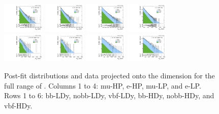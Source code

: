 \begin{figure}[htbp]
  \includegraphics[width=0.18\textwidth]{fig/fitValidation/PostFit_SR_MVV__mu_HP_nobb_HDy_Run2.pdf}
  \includegraphics[width=0.18\textwidth]{fig/fitValidation/PostFit_SR_MVV__e_HP_nobb_HDy_Run2.pdf}
  \includegraphics[width=0.18\textwidth]{fig/fitValidation/PostFit_SR_MVV__mu_LP_nobb_HDy_Run2.pdf}
  \includegraphics[width=0.18\textwidth]{fig/fitValidation/PostFit_SR_MVV__e_LP_nobb_HDy_Run2.pdf}\\
  \includegraphics[width=0.18\textwidth]{fig/fitValidation/PostFit_SR_MVV__mu_HP_vbf_HDy_Run2.pdf}
  \includegraphics[width=0.18\textwidth]{fig/fitValidation/PostFit_SR_MVV__e_HP_vbf_HDy_Run2.pdf}
  \includegraphics[width=0.18\textwidth]{fig/fitValidation/PostFit_SR_MVV__mu_LP_vbf_HDy_Run2.pdf}
  \includegraphics[width=0.18\textwidth]{fig/fitValidation/PostFit_SR_MVV__e_LP_vbf_HDy_Run2.pdf}\\
  \caption{
    Post-fit distributions and data projected onto the \MVV dimension for the full range of \MJ.
    Columns 1 to 4: mu-HP, e-HP, mu-LP, and e-LP.
    Rows 1 to 6: bb-LDy, nobb-LDy, vbf-LDy, bb-HDy, nobb-HDy, and vbf-HDy.
  }
  \label{fig:postfit_MVV_Run2}
\end{figure}

